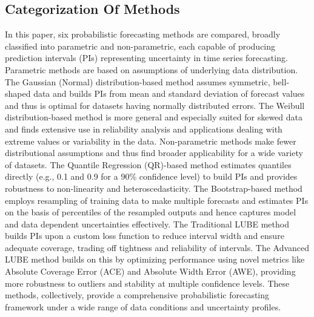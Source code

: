 \subsection{ Categorization Of Methods}
In this paper, six probabilistic forecasting methods are compared, broadly classified into parametric and non-parametric, each capable of producing prediction intervals (PIs) representing uncertainty in time series forecasting. Parametric methods are based on assumptions of underlying data distribution. The Gaussian (Normal) distribution-based method assumes symmetric, bell-shaped data and builds PIs from mean and standard deviation of forecast values and thus is optimal for datasets having normally distributed errors. The Weibull distribution-based method is more general and especially suited for skewed data and finds extensive use in reliability analysis and applications dealing with extreme values or variability in the data. Non-parametric methods make fewer distributional assumptions and thus find broader applicability for a wide variety of datasets. The Quantile Regression (QR)-based method estimates quantiles directly (e.g., 0.1 and 0.9 for a 90\% confidence level) to build PIs and provides robustness to non-linearity and heteroscedasticity. The Bootstrap-based method employs resampling of training data to make multiple forecasts and estimates PIs on the basis of percentiles of the resampled outputs and hence captures model and data dependent uncertainties effectively. The Traditional LUBE method builds PIs upon a custom loss function to reduce interval width and ensure adequate coverage, trading off tightness and reliability of intervals. The Advanced LUBE method builds on this by optimizing performance using novel metrics like Absolute Coverage Error (ACE) and Absolute Width Error (AWE), providing more robustness to outliers and stability at multiple confidence levels. These methods, collectively, provide a comprehensive probabilistic forecasting framework under a wide range of data conditions and uncertainty profiles.

